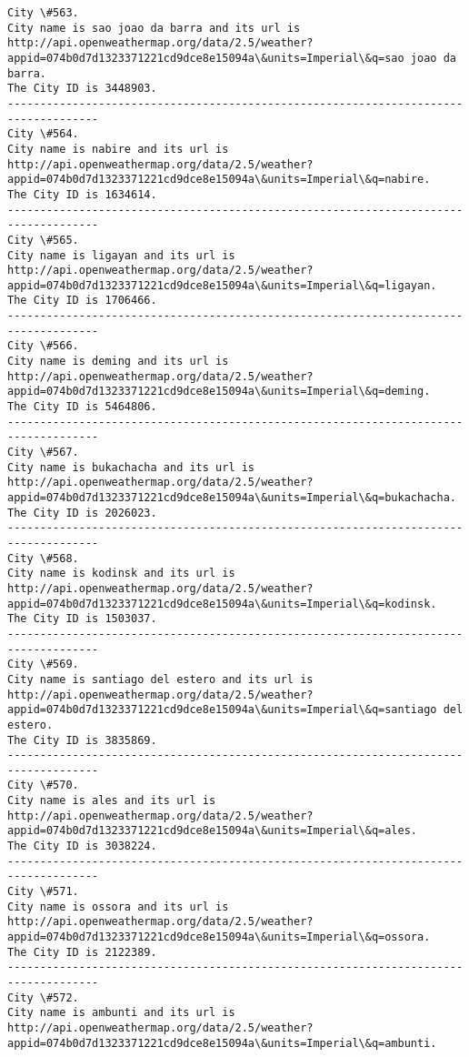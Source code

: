 \documentclass[11pt]{article}
\begin{document}
\begin{Verbatim}[commandchars=\\\{\}]
City \#563.
City name is sao joao da barra and its url is http://api.openweathermap.org/data/2.5/weather?appid=074b0d7d1323371221cd9dce8e15094a\&units=Imperial\&q=sao joao da barra.
The City ID is 3448903.
------------------------------------------------------------------------------------
City \#564.
City name is nabire and its url is http://api.openweathermap.org/data/2.5/weather?appid=074b0d7d1323371221cd9dce8e15094a\&units=Imperial\&q=nabire.
The City ID is 1634614.
------------------------------------------------------------------------------------
City \#565.
City name is ligayan and its url is http://api.openweathermap.org/data/2.5/weather?appid=074b0d7d1323371221cd9dce8e15094a\&units=Imperial\&q=ligayan.
The City ID is 1706466.
------------------------------------------------------------------------------------
City \#566.
City name is deming and its url is http://api.openweathermap.org/data/2.5/weather?appid=074b0d7d1323371221cd9dce8e15094a\&units=Imperial\&q=deming.
The City ID is 5464806.
------------------------------------------------------------------------------------
City \#567.
City name is bukachacha and its url is http://api.openweathermap.org/data/2.5/weather?appid=074b0d7d1323371221cd9dce8e15094a\&units=Imperial\&q=bukachacha.
The City ID is 2026023.
------------------------------------------------------------------------------------
City \#568.
City name is kodinsk and its url is http://api.openweathermap.org/data/2.5/weather?appid=074b0d7d1323371221cd9dce8e15094a\&units=Imperial\&q=kodinsk.
The City ID is 1503037.
------------------------------------------------------------------------------------
City \#569.
City name is santiago del estero and its url is http://api.openweathermap.org/data/2.5/weather?appid=074b0d7d1323371221cd9dce8e15094a\&units=Imperial\&q=santiago del estero.
The City ID is 3835869.
------------------------------------------------------------------------------------
City \#570.
City name is ales and its url is http://api.openweathermap.org/data/2.5/weather?appid=074b0d7d1323371221cd9dce8e15094a\&units=Imperial\&q=ales.
The City ID is 3038224.
------------------------------------------------------------------------------------
City \#571.
City name is ossora and its url is http://api.openweathermap.org/data/2.5/weather?appid=074b0d7d1323371221cd9dce8e15094a\&units=Imperial\&q=ossora.
The City ID is 2122389.
------------------------------------------------------------------------------------
City \#572.
City name is ambunti and its url is http://api.openweathermap.org/data/2.5/weather?appid=074b0d7d1323371221cd9dce8e15094a\&units=Imperial\&q=ambunti.

\end{Verbatim}
\end{document}
